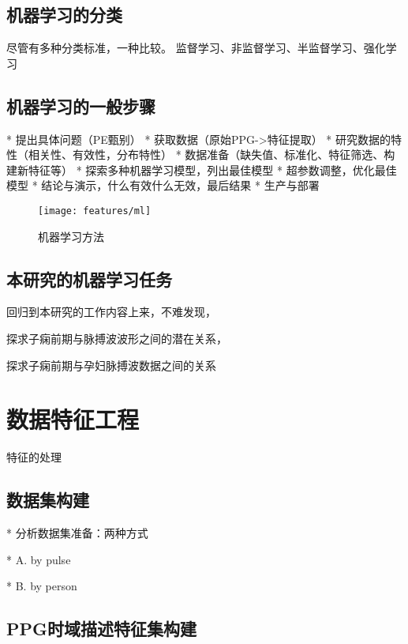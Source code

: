 \subsection{机器学习的分类}
尽管有多种分类标准，一种比较\cite{awad2015,Li2017}。
监督学习、非监督学习、半监督学习、强化学习

\subsection{机器学习的一般步骤}



* 提出具体问题（PE甄别）
* 获取数据（原始PPG->特征提取）
* 研究数据的特性（相关性、有效性，分布特性）
* 数据准备（缺失值、标准化、特征筛选、构建新特征等）
* 探索多种机器学习模型，列出最佳模型
* 超参数调整，优化最佳模型
* 结论与演示，什么有效什么无效，最后结果
* 生产与部署

\begin{figure}[htbp]
  \centering
  \texttt{[image: features/ml]}
  \caption[机器学习方法]{\label{fig:ml}机器学习方法\cite{Aurélien2018}}
\end{figure}
\subsection{本研究的机器学习任务}
回归到本研究的工作内容上来，不难发现，

探求子痫前期与脉搏波波形之间的潜在关系，

探求子痫前期与孕妇脉搏波数据之间的关系


\section{数据特征工程}
特征的处理

\subsection{数据集构建}
* 分析数据集准备：两种方式

  * A. by pulse

  * B. by person
\subsection{PPG时域描述特征集构建}

